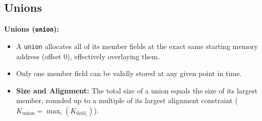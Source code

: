 \subsection{Unions}

\begin{definition}
    \textbf{Unions (\texttt{union}):}
    \begin{itemize}
        \item A \texttt{union} allocates all of its member fields at the exact same starting memory address (offset 0), effectively overlaying them.
        \item Only one member field can be validly stored at any given point in time.
        \item \textbf{Size and Alignment:} The total size of a union equals the size of its largest member, rounded up to a multiple of its largest alignment constraint ($K_{\text{union}} = \max_i(K_{\text{field}_i})$).
    \end{itemize}
\end{definition}